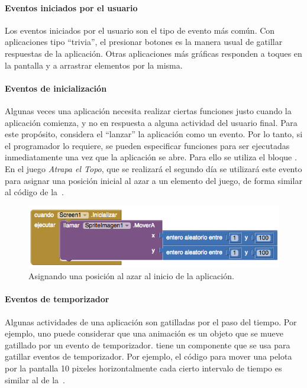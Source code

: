 \documentclass[letterpaper]{article}
\begin{document}
\paragraph{Eventos iniciados por el usuario}
Los eventos iniciados por el usuario son el tipo de evento más
común. Con aplicaciones tipo ``trivia'', el presionar botones es la
manera usual de gatillar respuestas de la aplicación. Otras
aplicaciones más gráficas responden a toques en la pantalla y a
arrastrar elementos por la misma.

\paragraph{Eventos de inicialización}
Algunas veces una aplicación necesita realizar ciertas funciones justo
cuando la aplicación comienza, y no en respuesta a alguna actividad
del usuario final. Para este propósito, \AppInventor considera el
“lanzar” la aplicación como un evento. Por lo tanto, si el programador
lo requiere, se pueden especificar funciones para ser ejecutadas
inmediatamente una vez que la aplicación se abre. Para ello se utiliza
el bloque . En el juego \emph{Atrapa el
  Topo}, que se realizará el segundo día se utilizará este evento para
asignar una posición inicial al azar a un elemento del juego, de forma
similar al código de la~.

\begin{figure}[H]
\centering
\includegraphics[scale=0.5]{figures/Initialize}
\caption{Asignando una posición al azar al inicio de la aplicación.}
\label{fig:initialize}
\end{figure}

\paragraph{Eventos de temporizador}
Algunas actividades de una aplicación son gatilladas por el paso del
tiempo. Por ejemplo, uno puede considerar que una animación es un
objeto que se mueve gatillado por un evento de
temporizador. \AppInventor tiene un componente  que
se usa para gatillar eventos de temporizador. Por ejemplo, el código
para mover una pelota por la pantalla 10 pixeles horizontalmente cada
cierto intervalo de tiempo es similar al de la~.
\end{document}
